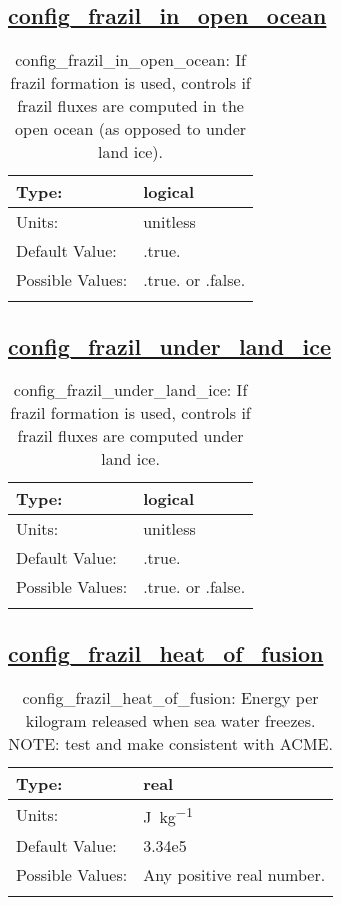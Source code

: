 \subsection[config\_frazil\_in\_open\_ocean]{\hyperref[sec:nm_tab_frazil_ice]{config\_frazil\_in\_open\_ocean}}
\label{subsec:nm_sec_config_frazil_in_open_ocean}
\begin{center}
\begin{longtable}{| p{2.0in} || p{4.0in} |}
    \hline
    Type: & logical \\
    \hline
    Units: & \si{unitless} \\
    \hline
    Default Value: & .true. \\
    \hline
    Possible Values: & .true. or .false. \\
    \hline
    \caption{config\_frazil\_in\_open\_ocean: If frazil formation is used, controls if frazil fluxes are computed in the open ocean (as opposed to under land ice).}
\end{longtable}
\end{center}
\subsection[config\_frazil\_under\_land\_ice]{\hyperref[sec:nm_tab_frazil_ice]{config\_frazil\_under\_land\_ice}}
\label{subsec:nm_sec_config_frazil_under_land_ice}
\begin{center}
\begin{longtable}{| p{2.0in} || p{4.0in} |}
    \hline
    Type: & logical \\
    \hline
    Units: & \si{unitless} \\
    \hline
    Default Value: & .true. \\
    \hline
    Possible Values: & .true. or .false. \\
    \hline
    \caption{config\_frazil\_under\_land\_ice: If frazil formation is used, controls if frazil fluxes are computed under land ice.}
\end{longtable}
\end{center}
\subsection[config\_frazil\_heat\_of\_fusion]{\hyperref[sec:nm_tab_frazil_ice]{config\_frazil\_heat\_of\_fusion}}
\label{subsec:nm_sec_config_frazil_heat_of_fusion}
\begin{center}
\begin{longtable}{| p{2.0in} || p{4.0in} |}
    \hline
    Type: & real \\
    \hline
    Units: & \si{J.kg^{-1}} \\
    \hline
    Default Value: & 3.34e5 \\
    \hline
    Possible Values: & Any positive real number. \\
    \hline
    \caption{config\_frazil\_heat\_of\_fusion: Energy per kilogram released when sea water freezes. NOTE: test and make consistent with ACME.}
\end{longtable}
\end{center}
